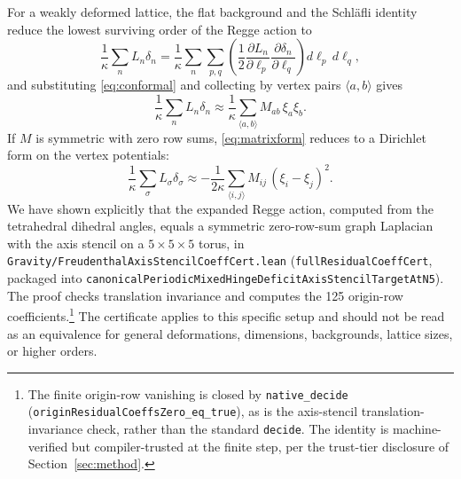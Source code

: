 \documentclass[11pt,letterpaper]{article}
\newcommand{\lean}[1]{\texttt{#1}}
\begin{document}
For a weakly deformed lattice, the flat background and the Schl\"afli identity reduce the lowest surviving order of the Regge action to \cite{RocekWilliams}
\begin{equation}
\frac{1}{\kappa}\sum_{n}L_{n}\delta_{n}=\frac{1}{\kappa}\sum_{n}\sum_{p,q}\left(\frac{1}{2}\frac{\partial L_{n}}{\partial\ell_{p}}\frac{\partial\delta_{n}}{\partial\ell_{q}}\right)d\ell_{p}\,d\ell_{q},
\label{eq:quadratic}
\end{equation}
and substituting \eqref{eq:conformal} and collecting by vertex pairs $\langle a,b\rangle$ gives
\begin{equation}
\frac{1}{\kappa}\sum_{n}L_{n}\delta_{n}\approx\frac{1}{\kappa}\sum_{\langle a,b\rangle}M_{ab}\,\xi_{a}\xi_{b}.
\label{eq:matrixform}
\end{equation}
If $M$ is symmetric with zero row sums, \eqref{eq:matrixform} reduces to a Dirichlet form on the vertex potentials:
\begin{equation}
\frac{1}{\kappa}\sum_{\sigma}L_{\sigma}\delta_{\sigma}\approx-\frac{1}{2\kappa}\sum_{\langle i,j\rangle}M_{ij}\,(\xi_{i}-\xi_{j})^{2}.
\label{eq:dirichlet}
\end{equation}
We have shown explicitly that the expanded Regge action, computed from the tetrahedral dihedral angles, equals a symmetric zero-row-sum graph Laplacian with the axis stencil on a $5\times5\times5$ torus, in \lean{Gravity/FreudenthalAxisStencilCoeffCert.lean} (\lean{fullResidualCoeffCert}, packaged into \lean{canonicalPeriodicMixedHingeDeficitAxisStencilTargetAtN5}). The proof checks translation invariance and computes the 125 origin-row coefficients.\footnote{The finite origin-row vanishing is closed by \lean{native\_decide} (\lean{originResidualCoeffsZero\_eq\_true}), as is the axis-stencil translation-invariance check, rather than the standard \lean{decide}. The identity is machine-verified but compiler-trusted at the finite step, per the trust-tier disclosure of Section~\ref{sec:method}.} The certificate applies to this specific setup and should not be read as an equivalence for general deformations, dimensions, backgrounds, lattice sizes, or higher orders.
\end{document}
